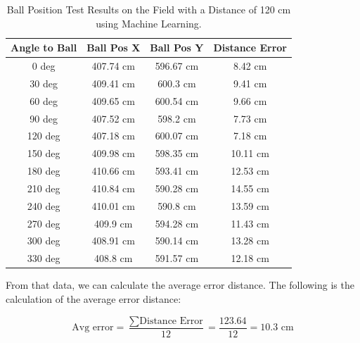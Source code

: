 
\begin{table}[H]
  \caption{Ball Position Test Results on the Field with a Distance of 120 cm using Machine Learning.}
  \begin{center}
    \begin{tabular}{|c|c|c|c|}
      \hline
    \rowcolor[HTML]{C0C0C0}
  \textbf{Angle to Ball} & \textbf{Ball Pos X} & \textbf{Ball Pos Y} & \textbf{Distance Error} \\
  \hline
  0 deg            & 407.74 cm                & 596.67 cm    & 8.42 cm        \\
  30 deg           & 409.41 cm                & 600.3 cm     & 9.41 cm        \\
  60 deg           & 409.65 cm                & 600.54 cm    & 9.66 cm         \\
  90 deg           & 407.52 cm                & 598.2 cm      & 7.73 cm      \\
  120 deg           & 407.18 cm                & 600.07 cm    & 7.18 cm        \\
  150 deg           & 409.98 cm                & 598.35 cm     & 10.11 cm       \\
  180 deg           & 410.66 cm                & 593.41 cm     & 12.53 cm       \\
  210 deg           & 410.84 cm                & 590.28 cm    & 14.55 cm        \\
  240 deg           & 410.01 cm                & 590.8 cm     & 13.59 cm      \\
  270 deg           & 409.9 cm                & 594.28 cm     & 11.43 cm      \\
  300 deg           & 408.91 cm                & 590.14 cm    & 13.28 cm       \\
  330 deg           & 408.8 cm                & 591.57 cm    & 12.18 cm       \\
\end{tabular}
\end{center}
\end{table}


From that data, we can calculate the average error distance. The following is the calculation of the average error distance:

\begin{equation}
  \text{Avg error} = \frac{\sum \text{Distance Error}}{12} = \frac{123.64}{12} = 10.3 \text{ cm}
\end{equation}

